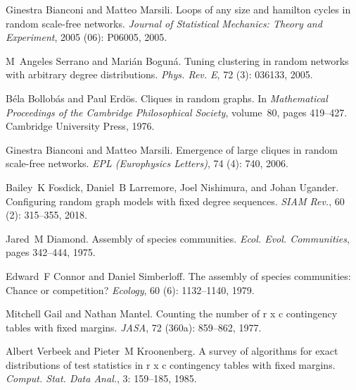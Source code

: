 Ginestra Bianconi and Matteo Marsili.
\newblock Loops of any size and hamilton cycles in random scale-free networks.
\newblock \emph{Journal of Statistical Mechanics: Theory and Experiment},
2005 (06): P06005, 2005.

M~Angeles Serrano and Mari{\'a}n Bogun{\'a}.
\newblock Tuning clustering in random networks with arbitrary degree
distributions.
\newblock \emph{Phys. Rev. E}, 72 (3): 036133, 2005.

B{\'e}la Bollob{\'a}s and Paul Erd{\"o}s.
\newblock Cliques in random graphs.
\newblock In \emph{Mathematical Proceedings of the Cambridge Philosophical
    Society}, volume~80, pages 419--427. {Cambridge University Press}, 1976.

Ginestra Bianconi and Matteo Marsili.
\newblock Emergence of large cliques in random scale-free networks.
\newblock \emph{EPL (Europhysics Letters)}, 74 (4): 740,
2006.

Bailey~K Fosdick, Daniel~B Larremore, Joel Nishimura, and Johan Ugander.
\newblock Configuring random graph models with fixed degree sequences.
\newblock \emph{SIAM Rev.}, 60 (2): 315--355, 2018.

Jared~M Diamond.
\newblock Assembly of species communities.
\newblock \emph{Ecol. Evol. Communities}, pages 342--444, 1975.

Edward~F Connor and Daniel Simberloff.
\newblock The assembly of species communities: Chance or competition?
\newblock \emph{Ecology}, 60 (6): 1132--1140, 1979.

Mitchell Gail and Nathan Mantel.
\newblock Counting the number of r x c contingency tables with fixed
margins.
\newblock \emph{JASA}, 72 (360a): 859--862, 1977.

Albert Verbeek and Pieter~M Kroonenberg.
\newblock A survey of algorithms for exact distributions of test statistics in
r x c contingency tables with fixed margins.
\newblock \emph{Comput. Stat. Data Anal.}, 3: 159--185, 1985.

